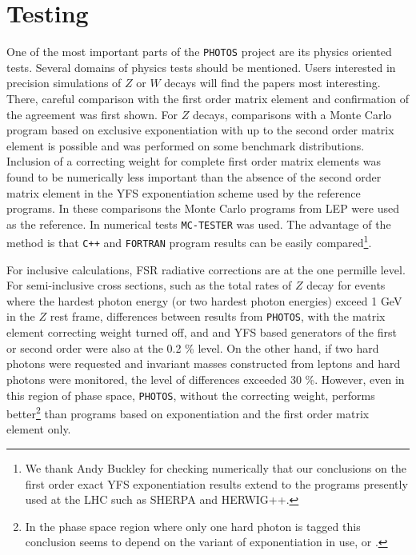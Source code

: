 \documentclass[]{Photos_interface_design}
\begin{document}
\section{Testing}
\label{sec:tests} 
One of the most important parts of the {\tt PHOTOS} project are its physics oriented tests.
Several domains
of physics tests should be mentioned. Users interested in precision 
simulations of $Z$ or $W$ decays  will 
find  the papers \cite{Nanava:2009vg,Golonka:2006tw,Golonka:2005pn}
most interesting. There, careful comparison with the first order matrix element 
and confirmation of the agreement was first shown.
For $Z$ decays, comparisons  with a Monte Carlo program based on exclusive 
exponentiation with up to the second order matrix element
is possible and was performed on some benchmark distributions.
Inclusion of a correcting weight for complete first order matrix elements was found to be numerically less important
than the absence of the second order matrix element in the YFS exponentiation scheme used by the reference programs. 
In these comparisons the Monte Carlo programs from LEP 
\cite{koralz4:1994,kkcpc:1999} were used as the reference. In numerical tests {\tt MC-TESTER} \cite{Davidson:2008ma}
was used. The advantage of the method is that {\tt C++} and {\tt FORTRAN} program
results can be easily compared\footnote{We thank Andy Buckley for checking numerically
 that our conclusions on the first order exact YFS exponentiation results extend
to the programs presently used at the LHC such as  
SHERPA and HERWIG++.  }.
 
For inclusive calculations, FSR radiative corrections are at the one permille level.
For semi-inclusive cross sections, such as the total rates of $Z$ decay for events
where the hardest photon energy (or two hardest photon energies)   exceed 1 GeV in the $Z$ rest frame, differences
between results from {\tt PHOTOS}, with the matrix element correcting weight turned off, and
and YFS based generators of the first or second order were also 
at the 0.2 \% level. 
On the other hand, if two  hard photons were requested and invariant masses constructed from leptons
and hard photons were monitored,
 the level of differences exceeded 
 30 \%. However, even in this region of phase space, {\tt PHOTOS},  without the correcting
weight, performs better\footnote{In 
  the phase space region where only one hard photon is tagged this conclusion seems to depend
  on the variant of exponentiation in use, \cite{koralz4:1994} or \cite{kkcpc:1999}.
                                }
than programs based on exponentiation and the first order matrix element only. 
\end{document}
